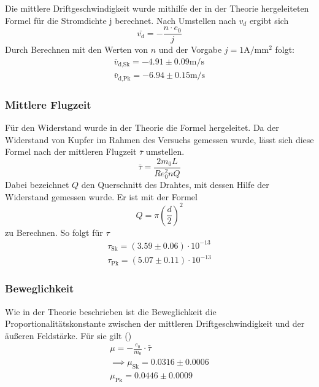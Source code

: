 Die mittlere Driftgeschwindigkeit wurde mithilfe der in der Theorie hergeleiteten
Formel für die Stromdichte j  berechnet. Nach Umstellen nach $v_d$ ergibt sich
\begin{equation}
\bar{v_d} = - \frac{n \cdot e_0}{j} 
\end{equation}
Durch Berechnen mit den Werten von $n$ und der Vorgabe $j = 1 \si{\ampere\per\milli\meter\squared}$
folgt:
\begin{align*}
\bar{v}_\text{d,Sk} = -4.91 \pm 0.09 \si{\m\per\s}\\
\bar{v}_\text{d,Pk} = -6.94 \pm 0.15 \si{\m\per\s}
\end{align*}

\subsubsection{Mittlere Flugzeit}

Für den Widerstand wurde in der Theorie die Formel  hergeleitet. Da der Widerstand
von Kupfer im Rahmen des Versuchs gemessen wurde, lässt sich diese Formel nach
der mittleren Flugzeit $\bar{\tau}$ umstellen.
\begin{equation}
\bar{\tau} = \frac{2 m_0 L}{R e_0^2 n Q}
\end{equation}
Dabei bezeichnet $Q$ den Querschnitt des Drahtes, mit dessen Hilfe der Widerstand gemessen wurde.
Er ist mit der Formel
\begin{equation}
Q = \pi \left( \frac{d}{2} \right)^2
\end{equation}
zu Berechnen. So folgt für $\tau$
\begin{align*}
\tau_\text{Sk} = \left( 3.59 \pm 0.06 \right) \cdot 10^{-13}\\
\tau_\text{Pk} = \left( 5.07 \pm 0.11 \right) \cdot 10^{-13}
\end{align*}

\subsubsection{Beweglichkeit}

Wie in der Theorie beschrieben ist die Beweglichkeit die Proportionalitätskonstante zwischen 
der mittleren Driftgeschwindigkeit und der äußeren Feldstärke. Für sie gilt ()
\begin{align*}
\mu = -\frac{e_0}{m_0} \cdot \bar{\tau} \\
\implies \mu_\text{Sk} = 0.0316 \pm 0.0006 \\
\mu_\text{Pk} = 0.0446 \pm 0.0009
\end{align*}

